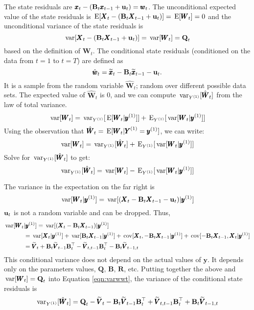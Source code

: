 \documentclass[]{article}
\def\UPS{\mbox{\boldmath $\Upsilon$}}
\def\BB{\mbox{$\mathbf B$}}	\def\bb{\mbox{$\mathbf b$}} \def\Bb{\mbox{$\mathbf J$}} \def\Ba{\mbox{$\mathbf L$}} \def\Bm{\UPS}
\def\E{\,\textup{\textrm{E}}}
\def\QQ{\mbox{$\mathbf Q$}}	 \def\qq{\mbox{$\mathbf q$}} \def\Qb{\mbox{$\mathbf G$}}  \def\Qm{\mathbb{Q}}
\def\RR{\mbox{$\mathbf R$}}	 \def\rr{\mbox{$\mathbf r$}} \def\Rb{\mbox{$\mathbf H$}}	\def\Rm{\mathbb{R}}
\def\VV{\mbox{$\pmb{V}$}}	\def\vv{\mbox{$\pmb{v}$}}
\def\WW{\mbox{$\pmb{W}$}}	\def\ww{\mbox{$\pmb{w}$}}
\def\XX{\mbox{$\pmb{X}$}}	\def\xx{\mbox{$\pmb{x}$}}
\def\YY{\mbox{$\pmb{Y}$}}	\def\yy{\mbox{$\pmb{y}$}}
\def\var{\,\textup{\textrm{var}}}
\def\cov{\,\textup{\textrm{cov}}}
\def\hatxt{\widetilde{\xx}_t}
\def\hatxtm{\widetilde{\mbox{$\xx$}}_{t-1}}
\def\hatVt{\widetilde{\VV}_t}
\def\hatVtm{\widetilde{\VV}_{t-1}}
\def\hatVttm{\widetilde{\VV}_{t,t-1}}
\begin{document}
The state residuals are $\xx_t - (\BB_t \xx_{t-1} + \uu_t)=\ww_t$.  The unconditional expected value of the state residuals is $\E[\XX_t - (\BB_t \XX_{t-1} + \uu_t)] = \E[\WW_t] = 0$ and the unconditional variance of the state residuals is
\begin{equation}
\var[\XX_t - (\BB_t \XX_{t-1} + \uu_t)] = \var[\WW_t] = \QQ_t
\end{equation}
based on the definition of $\WW_t$.
The conditional state residuals (conditioned on the data from $t=1$ to $t=T$) are defined as
\begin{equation}
\hat{\ww}_t = \hatxt - \BB_t\hatxtm - \uu_t.
\end{equation}
It is a sample from the random variable $\hat{\WW}_t$; random over different possible data sets.  The expected value of $\hat{\WW}_t$ is 0, and we can compute $\var_{Y^{(1)}}[\hat{\WW}_t]$ from the law of total variance.
\begin{equation}
\var[\WW_t] = \var_{Y^{(1)}}[\E[\WW_t|\yy^{(1)}]] + \E_{Y^{(1)}}[\var[\WW_t|\yy^{(1)}]]
\end{equation}
Using the observation that $\hat{\WW}_t=\E[\WW_t|\YY^{(1)}=\yy^{(1)}]$, we can write:
\begin{equation}
\var[\WW_t] = \var_{Y^{(1)}}[\hat{\WW}_t] + \E_{Y^{(1)}}[\var[\WW_t|\yy^{(1)}]]
\end{equation}
Solve for $\var_{Y^{(1)}}[\hat{\WW}_t]$ to get:
\begin{equation}\label{eqn:varwwt}
\var_{Y^{(1)}}[\hat{\WW}_t] = \var[\WW_t] - \E_{Y^{(1)}}[\var[\WW_t|\yy^{(1)}]]
\end{equation}

The variance in the expectation on the far right is
\begin{equation}
\var[\WW_t|\yy^{(1)}] = \var[ (\XX_t - \BB_t\XX_{t-1}-\uu_t) | \yy^{(1)} ]
\end{equation}
$\mbox{$\mathbf u$}_t$  is not a random variable and can be dropped. Thus,
\begin{equation}
\begin{split}
\var[\WW_t&|\yy^{(1)}] = \var[ (\XX_t - \BB_t\XX_{t-1}) | \yy^{(1)} ] \\
& = \var[ \XX_t | \yy^{(1)} ] + \var[\BB_t\XX_{t-1} | \yy^{(1)} ] + \cov[\XX_t, -\BB_t\XX_{t-1} | \yy^{(1)} ] + \cov[ -\BB_t\XX_{t-1}, \XX_t | \yy^{(1)} ]\\
& = \hatVt + \BB_t \hatVtm \BB_t^\top - \hatVttm \BB_t^\top - \BB_t\widetilde{\VV}_{t-1,t}
\end{split}
\end{equation}
This conditional variance does not depend on the actual values of $\yy$.  It depends only on the parameters values, $\QQ$, $\BB$, $\RR$, etc.
Putting together the above and $\var[\WW_t]=\QQ_t$ into Equation \ref{eqn:varwwt}, the variance of the conditional state residuals is
\begin{equation}
\var_{Y^{(1)}}[\hat{\WW}_t]  =  \QQ_t - \hatVt - \BB_t \hatVtm \BB_t^\top + \hatVttm \BB_t^\top + \BB_t\widetilde{\VV}_{t-1,t}
\end{equation}
\end{document}
